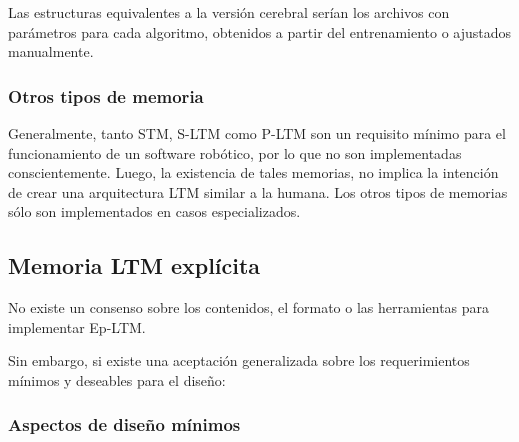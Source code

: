 Las estructuras equivalentes a la versi\'on cerebral ser\'ian los archivos con par\'ametros para cada algoritmo, obtenidos a partir del entrenamiento o ajustados manualmente.


\subsubsection{Otros tipos de memoria}

Generalmente, tanto STM, S-LTM como P-LTM son un requisito m\'inimo para el funcionamiento de un software rob\'otico, por lo que no son implementadas conscientemente. Luego, la existencia de tales memorias, no implica la intenci\'on de crear una arquitectura LTM similar a la humana. Los otros tipos de memorias s\'olo son implementados en casos especializados.



\subsection{Memoria LTM expl\'icita}\label{sec:ltm_exp}



No existe un consenso sobre los contenidos, el formato o las herramientas para implementar Ep-LTM.


Sin embargo, si existe una aceptaci\'on generalizada sobre los requerimientos m\'inimos y deseables para el dise\~no\cite{Vijayakumar2014}\cite{Ho2009}\cite{Stachowicz2012}\cite{Jockel2008}:

\subsubsection{Aspectos de dise\~no m\'inimos}



